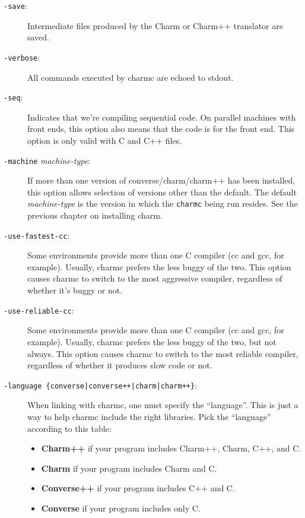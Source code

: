 \begin{description}
\item[{\tt -save}:]

Intermediate files produced by the Charm or Charm++ translator are saved.

\item[{\tt -verbose}:]

All commands executed by charmc are echoed to stdout.

\item[{\tt -seq}:]

Indicates that we're compiling sequential code.  On parallel machines
with front ends, this option also means that the code is for the front
end.  This option is only valid with C and C++ files.

\item[{\tt -machine} {\em machine-type}:]

If more than one version of converse/charm/charm++ has been installed,
this option allows selection of versions other than the default.  The
default {\em machine-type} is the version in which the {\tt charmc}
being run resides.  See the previous chapter on installing charm.

\item[{\tt -use-fastest-cc}:]

Some environments provide more than one C compiler (cc and gcc, for
example).  Usually, charmc prefers the less buggy of the two.  This
option causes charmc to switch to the most aggressive compiler,
regardless of whether it's buggy or not.

\item[{\tt -use-reliable-cc}:]

Some environments provide more than one C compiler (cc and gcc, for
example).  Usually, charmc prefers the less buggy of the two, but
not always.  This option causes charmc to switch to the most reliable
compiler, regardless of whether it produces slow code or not.

\item[{\tt -language \{converse|converse++|charm|charm++\}}:]

When linking with charmc, one must specify the ``language''.  This
is just a way to help charmc include the right libraries.  Pick the
``language'' according to this table:

\begin{itemize}
\item{{\bf Charm++} if your program includes Charm++, Charm, C++, and C.}
\item{{\bf Charm} if your program includes Charm and C.}
\item{{\bf Converse++} if your program includes C++ and C.}
\item{{\bf Converse} if your program includes only C.}
\end{itemize}


\end{description}
